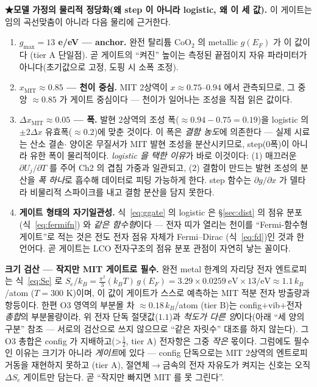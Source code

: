 \documentclass[11pt,a4paper]{article}
\begin{document}
\textbf{★모델 가정의 물리적 정당화(왜 step 이 아니라 logistic, 왜 이 세 값).} 이 게이트는 임의 곡선맞춤이 아니라
다음 물리에 근거한다.
\begin{enumerate}[label=(\roman*),leftmargin=2.2em,itemsep=2pt]
\item \textbf{$g_{\max}=13$ e/eV — anchor.} 완전 탈리튬 $\mathrm{CoO_2}$ 의 metallic $g(E_F)$ 가 이 값이다\cite{motohashi2009}
(tier A 단일점). 곧 게이트의 ``켜진'' 높이는 측정된 끝점이지 자유 파라미터가 아니다(초기값으로 고정, 도핑 시 소폭 조정).
\item \textbf{$x_\mathrm{MIT}\approx0.85$ — 천이 중심.} MIT 2상역이 $x\approx0.75$--$0.94$ 에서 관측되므로\cite{menetrier1999,reimers1992},
그 중앙 $\approx0.85$ 가 게이트 중심이다 — 천이가 일어나는 조성을 직접 읽은 값이다.
\item \textbf{$\Delta x_\mathrm{MIT}\approx0.05$ — 폭.} 발현 2상역의 조성 폭($\approx0.94{-}0.75=0.19$)을 logistic 의
$\pm2\Delta x$ 유효폭($\approx0.2$)에 맞춘 것이다. 이 폭은 \emph{결함 농도}에 의존한다 — 실제 시료는 산소 결손$\cdot$
양이온 무질서가 MIT 발현 조성을 분산시키므로, step(0폭)이 아니라 유한 폭이 물리적이다. \emph{logistic 을 택한 이유}가
바로 이것이다: (1) 매끄러운 $\partial U_j/\partial T$ 를 주어 Ch2 의 겹침 가중과 일관되고, (2) 결함이 만드는 발현 조성의
분산을 \emph{폭 하나}로 흡수해 데이터로 피팅 가능하게 한다. step 함수는 $\partial g/\partial x$ 가 델타라 비물리적
스파이크를 내고 결함 분산을 담지 못한다.
\item \textbf{게이트 형태의 자기일관성.} 식~\eqref{eq:ggate} 의 logistic 은 \S\ref{sec:dist} 의 점유 분포(식~\eqref{eq:fermifn})
와 \emph{같은 함수형}이다 — 전자 띠가 열리는 천이를 ``Fermi-함수형 게이트''로 적는 것은 전도 전자 점유 자체가 Fermi--Dirac
(식~\eqref{eq:fd})인 것과 한 언어다. 곧 게이트는 LCO 전자구조의 점유 분포 관점이 자연히 낳는 꼴이다.
\end{enumerate}

\textbf{크기 검산 — 작지만 MIT 게이트로 필수.} 완전 metal 한계의 자리당 전자 엔트로피는 식~\eqref{eq:Se} 로
$S_e/k_B=\tfrac{\pi^2}{3}(k_BT)\,g(E_F)=3.29\times0.0259\ \mathrm{eV}\times13/\mathrm{eV}\approx1.1\,k_B$/atom
($T{=}300$ K)이며, 이 값이 게이트가 스스로 예측하는 MIT 적분 전자 방출량과 항등이다. 한편 O3 영역의 부분몰 차
$\approx0.18\,k_B$/atom\cite{reynier2004} (tier B)는 config$+$vib$+$전자 \emph{총합}의 부분몰량이라, 위 전자 단독 절댓값($1.1$)과
\emph{척도가 다른 양}이다(아래 ``세 양의 구분'' 참조 — 서로의 검산으로 쓰지 않으므로 ``같은 자릿수'' 대조를 하지 않는다). 그
O3 총합은 config 가 지배하고(>$\tfrac12$\cite{reynier2004}, tier A) 전자항은 그중 \emph{작은} 몫이다. 그럼에도 필수인 이유는 크기가 아니라 \emph{게이트}에 있다 —
config 단독으로는 MIT 2상역의 엔트로피 거동을 재현하지 못하고\cite{ml2024} (tier A), 절연체$\to$금속의 전자 자유도가 켜지는
신호는 오직 $\Delta S_e$ 게이트만 담는다. 곧 ``작지만 빠지면 MIT 를 못 그린다''.
\end{document}
